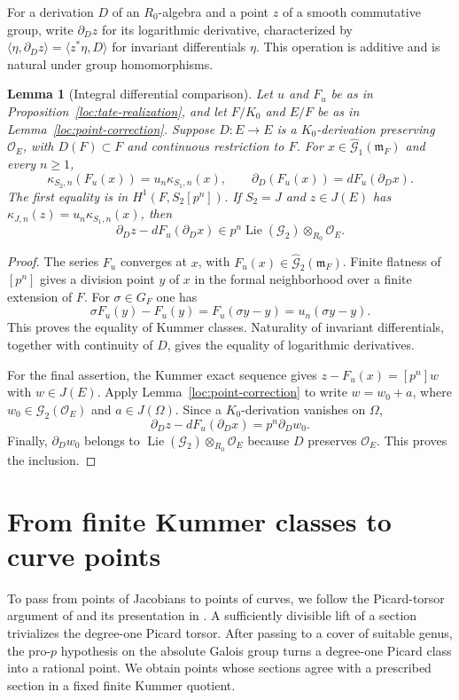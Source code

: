 \documentclass[11pt,a4paper]{article}
\numberwithin{equation}{section}
\theoremstyle{plain}
\newtheorem{lemma}[theorem]{Lemma}
\theoremstyle{definition}
\theoremstyle{remark}
\renewcommand{\S}{\ensuremath{\mathsection}}
\begin{document}
For a derivation $D$ of an $R_0$-algebra and a point $z$ of a smooth
commutative group, write $\partial_Dz$ for its logarithmic derivative,
characterized by
$\langle\eta,\partial_Dz\rangle=\langle z^*\eta,D\rangle$ for invariant
differentials $\eta$.  This operation is additive and is natural under
group homomorphisms.

\begin{lemma}[Integral differential comparison]
\label{loc:differential-comparison}
Let $u$ and $F_u$ be as in Proposition~\ref{loc:tate-realization}, and
let $F/K_0$ and $E/F$ be as in Lemma~\ref{loc:point-correction}.
Suppose $D:E\to E$ is a $K_0$-derivation preserving $\mathcal O_E$, with
$D(F)\subset F$ and continuous restriction to $F$.  For
$x\in\widehat{\mathcal G}_1(\mathfrak m_F)$ and every $n\ge1$,
\[
 \kappa_{S_2,n}(F_u(x))=u_n\kappa_{S_1,n}(x),\qquad
 \partial_D(F_u(x))=dF_u(\partial_Dx).
\]
The first equality is in $H^1(F,S_2[p^n])$.
If $S_2=J$ and $z\in J(E)$ has
$\kappa_{J,n}(z)=u_n\kappa_{S_1,n}(x)$, then
\[
 \partial_Dz-dF_u(\partial_Dx)
 \in p^n\operatorname{Lie}(\mathcal G_2)\otimes_{R_0}\mathcal O_E.
\]
\end{lemma}
\begin{proof}
The series $F_u$ converges at $x$, with
$F_u(x)\in\widehat{\mathcal G}_2(\mathfrak m_F)$.
Finite flatness of $[p^n]$ gives a division
point $y$ of $x$ in the formal neighborhood over a finite extension of
$F$.  For $\sigma\in G_F$ one has
\[
 \sigma F_u(y)-F_u(y)=F_u(\sigma y-y)=u_n(\sigma y-y).
\]
This proves the equality of Kummer classes.  Naturality of invariant
differentials, together with continuity of $D$, gives the equality of
logarithmic derivatives.

For the final assertion, the Kummer exact sequence gives
$z-F_u(x)=[p^n]w$ with $w\in J(E)$.  Apply
Lemma~\ref{loc:point-correction} to write $w=w_0+a$, where
$w_0\in\mathcal G_2(\mathcal O_E)$ and $a\in J(\Omega)$.
Since a $K_0$-derivation vanishes on $\Omega$,
\[
 \partial_Dz-dF_u(\partial_Dx)=p^n\partial_Dw_0.
\]
Finally, $\partial_Dw_0$ belongs to
$\operatorname{Lie}(\mathcal G_2)\otimes_{R_0}\mathcal O_E$ because $D$
preserves $\mathcal O_E$.  This proves the inclusion.
\end{proof}

\section{From finite Kummer classes to curve points}
\label{sec:approximation}

To pass from points of Jacobians to points of curves, we follow the
Picard-torsor argument of \cite[\S4, Proposition~7.4 and \S8]{Mochizuki1999}
and its presentation in \cite[\S5, Proposition~9 and Definition~10;
\S6]{Faltings1998}. A sufficiently divisible lift of a section
trivializes the degree-one Picard torsor. After passing to a cover of
suitable genus, the pro-$p$ hypothesis on the absolute Galois group
turns a degree-one Picard class into a rational point. We obtain points whose
sections agree with a prescribed section in a fixed finite Kummer quotient.
\end{document}
